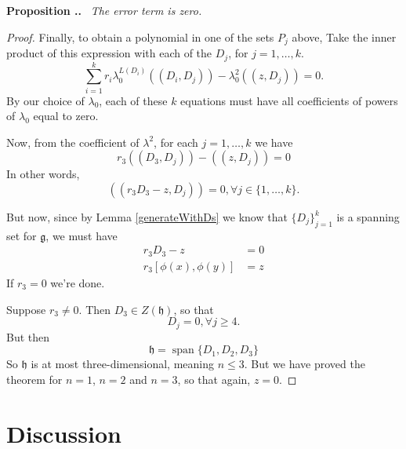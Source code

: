 \documentclass[honours]{UNSWthesis}
\newcommand{\g}{\mathfrak{g}}
\newcommand{\1}{\mathbf{e}_{1}}
\newcommand{\2}{\mathbf{e}_{3}}
\newcommand{\3}{\mathbf{e}_{3}}
\DeclareMathOperator{\spn}{span}
\newcounter{Item}[section]
\newenvironment{Proposition}{\medskip
                            \refstepcounter{Item}
                            \noindent
                           {\bf Proposition \thesection.\theItem.}\ %
                            \begingroup \sl}
                           {\endgroup\medskip}
\begin{document}
\begin{Proposition}
The error term is zero.
\end{Proposition}
\begin{proof}
Finally, to obtain a polynomial in one of the sets $P_j$ above, Take the inner product of this expression with each of the $D_j$, for $j=1,\ldots,k$.
\[
\sum\limits_{i=1}^{k}r_i \lambda_0^{L(D_i)}((D_i,D_j))-\lambda_0^2 ((z, D_j))=0.
\]
By our choice of $\lambda_0$, each of these $k$ equations must have all coefficients of powers of $\lambda_0$ equal to zero. 

Now, from the coefficient of $\lambda^2$, for each $j=1,\ldots,k$ we have
\[
r_3 ((D_3,D_j)) -((z, D_j)) =0
\]
In other words, 
\[
((r_3 D_3 -z,D_j))=0, \forall j \in \{1,\ldots,k\}.
\]

But now, since by Lemma \ref{generateWithDs} we know that $\{D_j\}_{j=1}^{k}$ is a spanning set for $\g$, we must have 
\begin{align*}
r_3 D_3 -z&=0 \\
r_3 [\phi(x),\phi(y)]&=z
\end{align*}
If $r_3 =0$ we're done. 

Suppose $r_3 \neq 0$. Then $D_3 \in Z(\mathfrak{h})$, so that 
\[
D_j=0, \forall j \geq 4.
\] 
But then 
\[
\mathfrak{h} = \spn \{ D_1,D_2,D_3 \}
\]
So $\mathfrak{h}$ is at most three-dimensional, meaning $n \leq 3$. But we have proved the theorem for $n=1$, $n=2$ and $n=3$, so that again, $z=0$.
\end{proof}


\chapter{Discussion}


\end{document}

